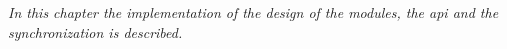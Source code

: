 \emph{In this chapter the implementation of the design of the modules, the \ac{api} and the synchronization is described.} 